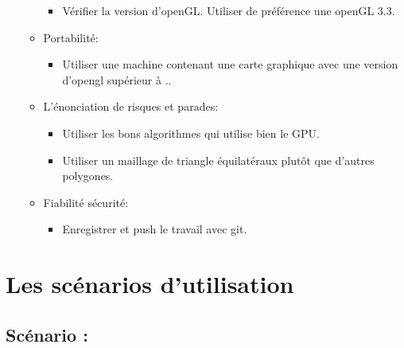 \documentclass[12pt]{report}
\begin{document}
\begin{enumerate}
\begin{itemize}
\begin{itemize}
                        \item Vérifier la version d'openGL. Utiliser de préférence une openGL 3.3.
                    \end{itemize}
                    \item Portabilité:
                    \begin{itemize}
                        \item Utiliser une machine contenant une carte graphique avec une version d'opengl supérieur à ..
                    \end{itemize}
                    \item L'énonciation de risques et parades: 
                    \begin{itemize}
                        \item Utiliser les bons algorithmes qui utilise bien le GPU. 
                        \item Utiliser un maillage de triangle équilatéraux plutôt que d'autres polygones.
                    \end{itemize}
                    \item Fiabilité sécurité: 
                    \begin{itemize}
                        \item Enregistrer et push le travail avec git.
                    \end{itemize}
                \end{itemize}
 \end{enumerate}
 
\newpage

\chapter{Les scénarios d'utilisation}
\section{Scénario :}
\end{document}
